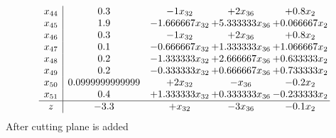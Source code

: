 \documentclass[11pt]{article}
\begin{document}
\[\begin{array}{c| c c@{\hskip 2pt} c@{\hskip 2pt} c@{\hskip 2pt} }
 x_{44}   &  0.3 & -1 x_{32} & + 2 x_{36} & + 0.8 x_{2}\\
 x_{45}   &  1.9 & -1.666667 x_{32} & + 5.333333 x_{36} & + 0.066667 x_{2}\\
 x_{46}   &  0.3 & -1 x_{32} & + 2 x_{36} & + 0.8 x_{2}\\
 x_{47}   &  0.1 & -0.666667 x_{32} & + 1.333333 x_{36} & + 1.066667 x_{2}\\
 x_{48}   &  0.2 & -1.333333 x_{32} & + 2.666667 x_{36} & + 0.633333 x_{2}\\
 x_{49}   &  0.2 & -0.333333 x_{32} & + 0.666667 x_{36} & + 0.733333 x_{2}\\
 x_{50}   &  0.0999999999999 & + 2 x_{32} & - x_{36} & -0.2 x_{2}\\
 x_{51}   &  0.4 & + 1.333333 x_{32} & + 0.333333 x_{36} & -0.233333 x_{2}\\
\hline
z    &  -3.3 & +  x_{32} & -3 x_{36} & -0.1 x_{2}\\
\end{array}\]
 After cutting plane is added 
\end{document}
